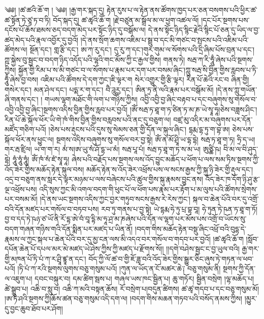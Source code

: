 \setcounter{footnote}{0} 
༄༅། །ཚ་ཚའི་ཆོ་ག ། ༄༅། །རྒྱ་གར་སྐད་དུ། རྟེན་རུས་པ་ལ་རྟེན་ནས་ཚོགས་ཁྱད་པར་ཅན་བསགས་པའི་ཕྱིར་ཚ་ཚ་སྟོན་ཏེ་ཙཱ་ཏ་བ་ཏི། བོད་སྐད་དུ། ཚ་ཚྭའི་ཆོ་ག །རྗེ་བཙུན་མ་སྒྲོལ་མ་ལ་ཕྱག་འཚལ་ལོ། །དང་པོར་སྔགས་པས་དངོས་པོ་ཆོས་ཐམས་ཅད་བདག་མེད་པར་སྟོང་ཉིད་དུ་བསྒོམ་ལ། དེ་ནས་སྟོང་ཉིད་སྙིང་རྗེའི་སྙིང་པོ་ཅན་དུ་ཡིད་ལ་བྱ་ཚད་མེད་པའི་རྣལ་འབྱོར་དུ་བྱའོ། །དེ་ནས་སྲོག་ཆགས་འཇིམ་པ་སྦྲུ་བ་དང་མི་གཙང་བ་སྤངས་པའི་འཇིམ་པའི་ཚོགས་ལ། སྔོན་དང་། གླ་རྩི་དང་། ཨ་ཀ་རུ་དང་། དུ་རུ་ཀ་དང་།གུར་གུམ་ལ་སོགས་པའི་དྲི་ཞིམ་པོས་བྲན་པ་དང་། ཀྵ་སྐྱེས་བུ་སྦྱང་བ་བདག་ཉིད་འདོད་པའི་ལྷའི་གང་མོས་ཀྱི་ང་རྒྱལ་གྱིས། གནས་ཏེ། སརྦ་ཀ་རི་ཧཱུྃ་ཞེས་པའི་སྔགས་ཀྱིས། སྐྱོན་གྱི་རིམ་པ་ས་མི་གཙང་བ་ལ་སོགས་པ་རྣམ་པར་དག་པར་བསམ་ཞིང་།ཀླུ་སརྦ་སི་བྱིན་གྱིས་རླབས་པ་ཏི་ཧཱུྃ་ཞེས་བྱ་བས། འཇིམ་པའི་ཚོགས་དེ་དག་ཀྱང་།ཇི་ལྟར་ག སེར་འགྱུར་གྱི་རྩི་ལྟར། རིན་པོ་ཆེའི་རང་བ ཞིན་གྱི།གསེར་དང་། མན་ཤེལ་དང་། པདྨ་ར་ག་དང་། བཻ་ཌཱུརྱ་དང་། ཨིན་ཏྲ་ནི་ལའི་རྣམ་པར་བསྒོམ་མོ། །དེ་ནས་ཀླུ་གཡོན་ཞི་གནས་དང་། ། གཡས་ལྷག་མཐོང་གི་ལག་པ་གཉིས་ཀྱིས། འབྱི་འབྱི་བྱ་ཞིང་བརྟབ་པ་དང་བཞུགས་སུ་གསོལ་བ་འབྱི་འབྱི་བྱ་ཞིང་།སྔགས་འདིས་བྱིན་གྱིས་རླབ་པར་བྱའོ། །ཨོཾ་སརྦ་ཏ་ཐཱ་ག་ཏ་ཙིན་ཏ་མ་ཎ་ཡེ་སྭཱ་ཧཱ།ཅེས་བཟླས་ཤིང་། རིན་པོ་ཆེ་སྐོལ་ཕོར་ཡི་གེ་ཁཾ་གིས་བྱིན་གྱིས་བརླབས་པའི་ནང་དུ་བཅུག་ལ། བཛྲ་མུ་འདིར་མ་བཞུགས་པར་དོན་མཛོད་གཅིག་པའོ། །ཅེས་པས་རྡུངས་པའི་དུས་སུ་སེམས་ཅན་གྱི་དོན་ལ་སྐུལ་ཞིང་། དྷརྨ་དྷ་ཏུ་ག་བྷ་ཨ། ཅེས་པས་སྐོལ་ཕོར་ནས་ཕྱུང་ལ། སྔགས་འདིས་བཞུགས་སུ་གསོལ་བར་བྱ་སྟེ། ཨོཾ་ན་མོ་ཤྲཱི་ཡ་དྷ་དྷེ། སརྦ་ཏ་ཐཱ་ག་ཏ། ཧྲི་ད་ཡ། གར་རྦ་ཛྲིལ། ཡ་ག་ག་ར། མཾ་ས།ཨ་ཡུ་སཾ་ཤོ་དྷ་ཡ་མཾ། སརྦ་པཱ་པཾ། སརྦ་ཏ་ཐཱ་ག་ཏ་ས་མ་ཡ། ཨུཙྪི་ཥ། བི་མ་ལ་བི་ཤུད་དྷེ། ཧཱུཾ་ཧཱུཾ་ཧཱུཾ། ཨོཾ་ཁཾ་སཾ་ཛཾ་སྭཱ་ཧཱ། ཞེས་པའི་བརྗོད་པས་སྔགས་ལས་འོད་བྱུང་མཆོད་པ་ཕོག་པ་ལས་སམ་ཏིས་སྔགས་ཀྱི་འོད་ཟེར་གྱིས་མཆོད་རྟེན་སྐུལ་བས། མཆོད་རྟེན་ས་འོད་ཟེར་འཕྲོས་པས་ལ་སངས་རྒྱས་ཀྱི་སྐུ་ཉི་ཟེར་གྱི་རྡུལ་དང་། འདྲ་བ་བཅུག་ནས་སླར་དེ་ལྟར་མཉམ་པ་ལས་བཞེངས་པའི་ཚུལ་གྱིས་སྐུ་རྣམས་བྱུང་ནས། འོད་ཟེར་ཁ་དོག་ཉི་ཤུ་རྩ་ལྔ་འཕྲོས་པས། འདི་སུས་ཀྱང་མི་འགལ་བདག་གི་ཕུང་པོ་ལ་ཕོག་པས་རྣམ་པར་རྟོག་པ་མ་ལུས་པའི་ཚོགས་སྲེགས་པར་བསམ་མོ། །དེ་ནས་ཡང་སྔགས་འདིས་ཀྱང་བྱར་གཏུབ་སངས་རྒྱས་རེ་རེས་ཀྱང་། སྐལ་བ་ཆེན་པོའི་བར་དུ་འགྲོ་བའི་དོན་མཛད་པར་གསོལ་བ་བཏབ་པས། རབ་ཏུ་གནས་པ་བྱ་སྟེ། ཡེ་དྷརྨ་ཧེ་ཏུ་པྲ་བྷ་བཱ། ཧེ་ཏུན་ཏེ་ཥན་ཏ་ཐཱ་ག་ཏོ། བྱ་བ་དད་ཏེ་ཥཉ་ཙ་ཡོ་ནི་རོ་དྷ་ཨེ་བཾ་བཱ་དྷི་མ་ཧཱ་ཤྲ་མ་ཎཞེས་པའི་དོན་ལ་ལྷག་པར་མོས་པས་འགྲོ་བ་ཡོངས་སུ་བདག་གཞན་གཉིས་གའི་དོན་སྨིན་པར་མཛད་པ་ཡིན་ནོ། །བདག་གིས་མཆོད་རྟེན་བསྡུ་ཞིང་འཕྲོ་བའི་བུདྷ་དེ་རྣམས་ལ་ཀྱང་སྐལ་པ་ཆེན་པོའི་བར་དུ་མྱ་ངན་ལས་མི་འདའ་བར་གསོལ་བ་གདབ་པར་བྱའོ། །ཚ་ཚྭའི་ཆོ་ག །སློབ་དཔོན་ཆེན་པོ་དཔལ་མར་མེ་མཛད་ཡེ་ཤེས་ཀྱིས་ཀྱི་མཛད་པ་རྫོགས་སོ།། །།དགེ་བཤེས་སྦྱང་ང་བྱ་ཡུལ་བའི། རྒྱ་གར་གྱི་མཁན་པོ་ཏི་པཾ་ཀ་ར་ཤྲཱི་ཛྙཱ་ན་དང་། བོད་ཀྱི་ལོ་ཚ་བ་གྱི་ཇོ་ཟླ་བའི་འོད་ཟེར་གྱིས་སྒྱུར་ཅིང་ཞུས་ཏེ་གཏན་ལ་ཕབ་པའོ། །ཏི་པཾ་ཀ་རའི་སྔགས་ལུགས་བཅུ་གསུམ་པའོ། །ཀུན་ལ་ཡོད་ན་ངོ་མཚར་ཆེ༑ བཅུ་གསུམ་ནི། སྔགས་ཀྱི་དོན་ལ་འཇུག་པ། དབང་བསྐུར་བ། དམ་ཚིག་སྦས་པ། གཞལ་ཡས་ཁང་སྦྱིན་པ། ཆུ་གཏོར། སྦྱིན་བསྲེག །ལྷ་མཆོད་པ། ཚེ་སྒྲུབ་པ། འཆི་བ་སླུ་བ། འཆི་ཀ་མའི་བསྟན་ཆོས། རོ་བསྲེག་པ།བདུན་ཚིགས། ཚ་ཚྭ་གདབ་པ་དང་བཅུ་གསུམ་མོ། །ཨ་ཏི་ཤའི་སྔགས་ཀྱི།ཆོས་ཚན་བཅུ་གསུམ་འདི་དག་ལ། །བདག་གིས་མཆན་གཏབ་པའི་བསོད་ནམས་ཀྱིས། །མྱུར་དུ་བྱང་ཆུབ་ཐོབ་པར་ཤོག།